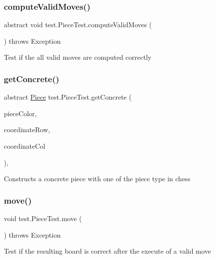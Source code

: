 \subsubsection{\texorpdfstring{compute\+Valid\+Moves()}{computeValidMoves()}}
{\footnotesize\ttfamily abstract void test.\+Piece\+Test.\+compute\+Valid\+Moves (\begin{DoxyParamCaption}{ }\end{DoxyParamCaption}) throws Exception\hspace{0.3cm}{\ttfamily [abstract]}}

Test if the all valid moves are computed correctly \mbox{\label{classtest_1_1_piece_test_a90a462bad11a172acd27d1b18e21ee15}} 
\subsubsection{\texorpdfstring{get\+Concrete()}{getConcrete()}}
{\footnotesize\ttfamily abstract \mbox{\hyperlink{classpieces_1_1_piece}{Piece}} test.\+Piece\+Test.\+get\+Concrete (\begin{DoxyParamCaption}\item[{Piece.\+Piece\+Color}]{piece\+Color,  }\item[{int}]{coordinate\+Row,  }\item[{int}]{coordinate\+Col }\end{DoxyParamCaption})\hspace{0.3cm}{\ttfamily [abstract]}, {\ttfamily [protected]}}

Constructs a concrete piece with one of the piece type in chess \mbox{\label{classtest_1_1_piece_test_aaf5df7af55f8bbcb89bd2554b1876709}} 
\subsubsection{\texorpdfstring{move()}{move()}}
{\footnotesize\ttfamily void test.\+Piece\+Test.\+move (\begin{DoxyParamCaption}{ }\end{DoxyParamCaption}) throws Exception}

Test if the resulting board is correct after the execute of a valid move \mbox{\label{classtest_1_1_piece_test_a4680ac39911c714af4402657d7b5a3e2}} 
